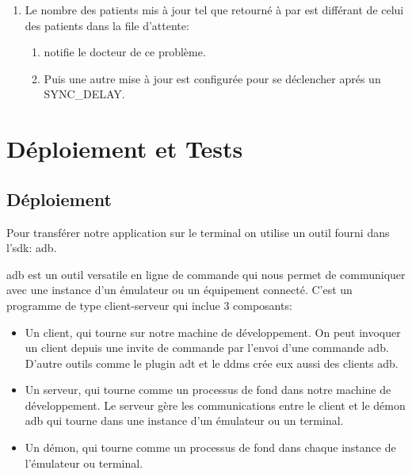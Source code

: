 \begin{enumerate}[label=\ref{enu:equalpatients}.\alph*]

\item Le nombre des patients mis à jour tel que retourné à par  est différant de celui des patients dans la file d'attente:\label{enu:alt_equalSpatients}

\begin{enumerate}[label=\ref{enu:alt_equalSpatients}.\arabic*]

\item {} notifie le docteur de ce problème.

\item Puis une autre mise à jour est configurée pour se déclencher aprés un SYNC\_DELAY.

\end{enumerate}

\end{enumerate}

\section{Déploiement et Tests}

\subsection{Déploiement}

Pour transférer notre application sur le terminal \android{} on utilise un outil fourni dans l'\gls{sdk}: \gls{adb}.

\gls{adb}\cite{tools:adb} est un outil versatile en ligne de commande qui nous permet de communiquer avec une instance d'un émulateur ou un équipement \android{} connecté. C'est un programme de type client-serveur qui inclue 3 composants:

\begin{itemize}

\item Un client, qui tourne sur notre machine de développement. On peut invoquer
un client depuis une invite de commande par l’envoi d'une commande \gls{adb}.
D'autre outils \android{} comme le plugin \gls{adt} et le \gls{ddms} crée eux
aussi des clients \gls{adb}.

\item Un serveur, qui tourne comme un processus de fond dans notre machine de
développement. Le serveur gère les communications entre le client et le démon
\gls{adb} qui tourne dans une instance d'un émulateur ou un terminal.

\item Un démon, qui tourne comme un processus de fond dans chaque instance de l’émulateur ou terminal.

\end{itemize}

